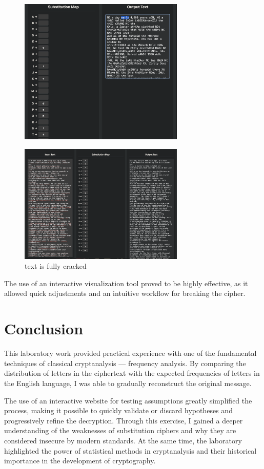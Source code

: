 \documentclass[12pt]{article}
\begin{document}
\begin{figure}
    \centering
    \includegraphics[width=0.7\textwidth]{step_3.png}
    \caption{}
\end{figure}
\begin{figure}
    \centering
    \includegraphics[width=0.7\textwidth]{final_result.png}
    \caption{text is fully cracked}
\end{figure}

The use of an interactive visualization tool proved to be highly effective, as it allowed quick 
adjustments and an intuitive workflow for breaking the cipher.



\clearpage
\section{Conclusion}

This laboratory work provided practical experience with one of the fundamental techniques of 
classical cryptanalysis — frequency analysis. By comparing the distribution of letters in the 
ciphertext with the expected frequencies of letters in the English language, I was able to 
gradually reconstruct the original message.  

The use of an interactive website for testing assumptions greatly simplified the process, making 
it possible to quickly validate or discard hypotheses and progressively refine the decryption.  
Through this exercise, I gained a deeper understanding of the weaknesses of substitution ciphers 
and why they are considered insecure by modern standards. At the same time, the laboratory 
highlighted the power of statistical methods in cryptanalysis and their historical importance in 
the development of cryptography.
\end{document}
